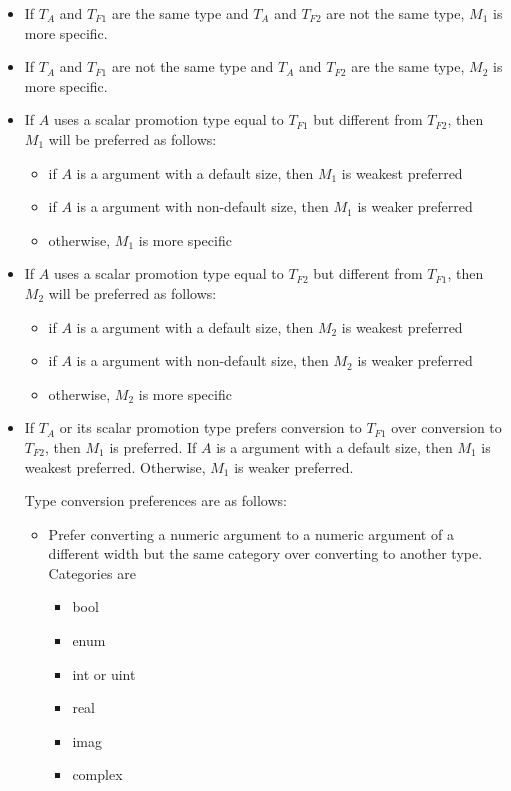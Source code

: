 \begin{itemize}
\item
 If $T_A$ and $T_{F1}$ are the same type and $T_A$ and $T_{F2}$ are
 not the same type, $M_1$ is more specific.
\item
 If $T_A$ and $T_{F1}$ are not the same type and $T_A$ and $T_{F2}$
 are the same type, $M_2$ is more specific.

\item
If $A$ uses a scalar promotion type equal to $T_{F1}$ but different
from $T_{F2}$, then $M_1$ will be preferred as follows:

\begin{itemize}
  \item if $A$ is a  argument with a default size, then $M_1$
    is weakest preferred
  \item if $A$ is a  argument with non-default size, then $M_1$
    is weaker preferred
  \item otherwise, $M_1$ is more specific
\end{itemize}

\item
If $A$ uses a scalar promotion type equal to $T_{F2}$ but different
from $T_{F1}$, then $M_2$ will be preferred as follows:

\begin{itemize}
  \item if $A$ is a  argument with a default size, then $M_2$
    is weakest preferred
  \item if $A$ is a  argument with non-default size, then $M_2$
    is weaker preferred
  \item otherwise, $M_2$ is more specific
\end{itemize}

\item
If $T_A$ or its scalar promotion type prefers conversion to $T_{F1}$
over conversion to $T_{F2}$, then $M_1$ is preferred. If $A$ is a
 argument with a default size, then $M_1$ is weakest
preferred. Otherwise, $M_1$ is weaker preferred.

Type conversion preferences are as follows:
\begin{itemize}
  \item
    Prefer converting a numeric argument to a numeric argument of
    a different width but the same category
    over converting to another type. Categories are
    \begin{itemize}
      \item
        bool
      \item
        enum
      \item
        int or uint
      \item
        real
      \item
        imag
      \item
        complex
    \end{itemize}


\end{itemize}
\end{itemize}
